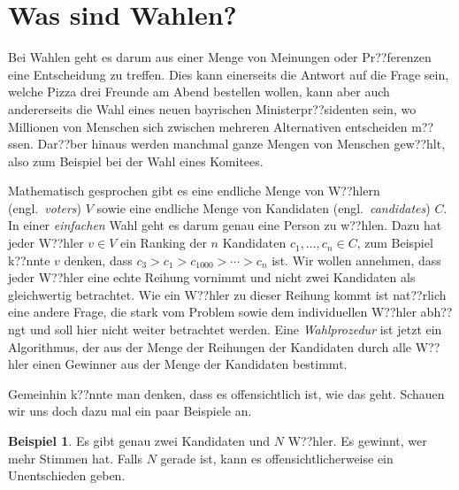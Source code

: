 \documentclass{zirkelblatt1415}
\theoremstyle{definition}
\theoremstyle{definition}
\newtheorem*{beispiel}{Beispiel}
\theoremstyle{definition}
\theoremstyle{definition}
\theoremstyle{remark}
\begin{document}

\tableofcontents



\section{Was sind Wahlen?}

Bei Wahlen geht es darum aus einer Menge von Meinungen oder Pr??ferenzen eine Entscheidung zu treffen. Dies kann einerseits die Antwort auf die Frage sein, welche Pizza drei Freunde am Abend bestellen wollen, kann aber auch andererseits die Wahl eines neuen bayrischen Ministerpr??sidenten sein, wo Millionen von Menschen sich zwischen mehreren Alternativen entscheiden m??ssen. Dar??ber hinaus werden manchmal ganze Mengen von Menschen gew??hlt, also zum Beispiel bei der Wahl eines Komitees.

Mathematisch gesprochen gibt es eine endliche Menge von W??hlern (engl.\ \emph{voters}) $V$ sowie eine endliche Menge von Kandidaten (engl.\ \emph{candidates}) $C$. In einer \emph{einfachen} Wahl geht es darum genau eine Person zu w??hlen. Dazu hat jeder W??hler $v\in V$ ein Ranking der $n$  Kandidaten $c_1,\ldots,c_n\in C$, zum Beispiel k??nnte $v$ denken, dass $c_3>c_1>c_{1000}>\cdots >c_n$ ist. Wir wollen annehmen, dass jeder W??hler eine echte Reihung vornimmt und nicht zwei Kandidaten als gleichwertig betrachtet. Wie ein W??hler zu dieser Reihung kommt ist nat??rlich eine andere Frage, die stark vom Problem sowie dem individuellen W??hler abh??ngt und soll hier nicht weiter betrachtet werden. Eine \emph{Wahlprozedur} ist jetzt ein Algorithmus, der aus der Menge der Reihungen der Kandidaten durch alle W??hler einen Gewinner aus der Menge der Kandidaten bestimmt.

Gemeinhin k??nnte man denken, dass es offensichtlich ist, wie das geht. Schauen wir uns doch dazu mal ein paar Beispiele an.

\begin{beispiel}
  Es gibt genau zwei Kandidaten und $N$ W??hler. Es gewinnt, wer mehr Stimmen hat. Falls $N$ gerade ist, kann es offensichtlicherweise ein Unentschieden geben.
\end{beispiel}
\end{document}

